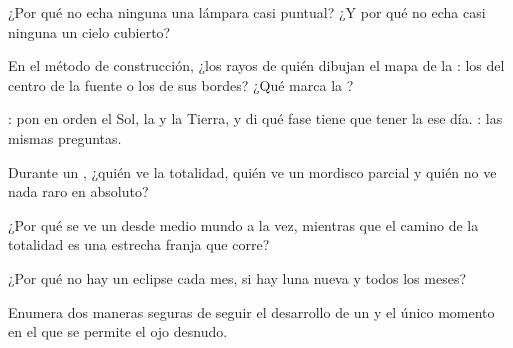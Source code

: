 \begin{exercise}[$\star$]\label{exo:g7:shadows-eclipses:2}
¿Por qué no echa ninguna  una lámpara casi puntual? ¿Y por
qué no echa casi ninguna  un cielo cubierto?
\end{exercise}

\begin{exercise}[$\star$]\label{exo:g7:shadows-eclipses:3}
En el método de construcción, ¿los rayos de quién dibujan el mapa de
la : los del centro de la fuente o los de sus bordes? ¿Qué
marca la ?
\end{exercise}

\begin{exercise}[$\star$]\label{exo:g7:shadows-eclipses:4}
: pon en orden el Sol, la  y la Tierra, y di
qué fase tiene que tener la  ese día.
: las mismas preguntas.
\end{exercise}

\begin{exercise}[$\star$]\label{exo:g7:shadows-eclipses:5}
Durante un , ¿quién ve la totalidad, quién ve un
mordisco parcial y quién no ve nada raro en absoluto?
\end{exercise}

\begin{exercise}[$\star$]\label{exo:g7:shadows-eclipses:6}
¿Por qué se ve un  desde medio mundo a la vez,
mientras que el camino de la totalidad es una estrecha franja que
corre?
\end{exercise}

\begin{exercise}[$\star$]\label{exo:g7:shadows-eclipses:7}
¿Por qué no hay un eclipse cada mes, si hay luna nueva y
 todos los meses?
\end{exercise}

\begin{exercise}[$\star$]\label{exo:g7:shadows-eclipses:8}
Enumera dos maneras seguras de seguir el desarrollo de un
 y el único momento en el que se permite el ojo
desnudo.
\end{exercise}

